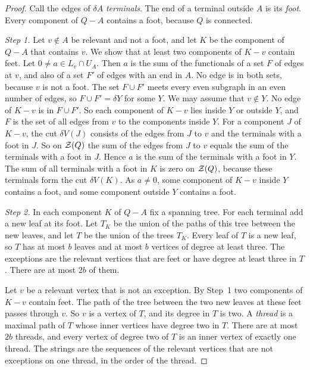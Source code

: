 \begin{proof}
Call the edges of $\delta A$ \emph{terminals}. The end of a terminal outside $A$ is its
\emph{foot}. Every component of $Q-A$ contains a foot, because $Q$ is connected.

\emph{Step 1.} Let $v\notin A$ be relevant and not a foot, and let $K$ be the component of $Q-A$
that contains $v$. We show that at least two components of $K-v$ contain feet. Let
$0\ne a\in L_v\cap U_A$. Then $a$ is the sum of the functionals of a set $F$ of edges at $v$, and
also of a set $F'$ of edges with an end in $A$. No edge is in both sets, because $v$ is not a foot.
The set $F\cup F'$ meets every even subgraph in an even number of edges, so $F\cup F'=\delta Y$ for
some $Y$. We may assume that $v\notin Y$. No edge of $K-v$ is in $F\cup F'$. So each component of
$K-v$ lies inside $Y$ or outside $Y$, and $F$ is the set of all edges from $v$ to the components
inside $Y$. For a component $J$ of $K-v$, the cut $\delta V(J)$ consists of the edges from $J$ to
$v$ and the terminals with a foot in $J$. So on $\mathcal{Z}(Q)$ the sum of the edges from $J$ to $v$ equals
the sum of the terminals with a foot in $J$. Hence $a$ is the sum of the terminals with a foot in
$Y$. The sum of all terminals with a foot in $K$ is zero on $\mathcal{Z}(Q)$, because these terminals form
the cut $\delta V(K)$. As $a\ne0$, some component of $K-v$ inside $Y$ contains a foot, and some
component outside $Y$ contains a foot.

\emph{Step 2.} In each component $K$ of $Q-A$ fix a spanning tree. For each terminal add a new leaf
at its foot. Let $T_K$ be the union of the paths of this tree between the new leaves, and let $T$
be the union of the trees $T_K$. Every leaf of $T$ is a new leaf, so $T$ has at most $b$ leaves and
at most $b$ vertices of degree at least three. The exceptions are the relevant vertices that are
feet or have degree at least three in $T$. There are at most $2b$ of them.

Let $v$ be a relevant vertex that is not an exception. By Step~1 two components of $K-v$ contain
feet. The path of the tree between the two new leaves at these feet passes through $v$. So $v$ is
a vertex of $T$, and its degree in $T$ is two. A \emph{thread} is a maximal path of $T$ whose inner
vertices have degree two in $T$. There are at most $2b$ threads, and every vertex of degree two of
$T$ is an inner vertex of exactly one thread. The strings are the sequences of the relevant
vertices that are not exceptions on one thread, in the order of the thread.


\end{proof}
